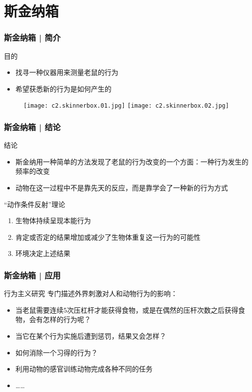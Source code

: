 \section{斯金纳箱}
\begin{frame}
  \frametitle{斯金纳箱 | 简介}
  \begin{block}{目的}
    \begin{itemize}
      \item 找寻一种仪器用来测量老鼠的行为
      \item 希望获悉新的行为是如何产生的
    \end{itemize}
  \end{block}
  \begin{figure}
    \centering
    \texttt{[image: c2.skinnerbox.01.jpg]}
    \texttt{[image: c2.skinnerbox.02.jpg]}
  \end{figure}
\end{frame}

\begin{frame}
  \frametitle{斯金纳箱 | 结论}
  \begin{block}{结论}
    \begin{itemize}
      \item 斯金纳用一种简单的方法发现了老鼠的行为改变的一个方面：一种行为发生的频率的改变
      \item 动物在这一过程中不是靠先天的反应，而是靠学会了一种新的行为方式
    \end{itemize}
  \end{block}
  \pause
  \begin{block}{“动作条件反射”理论}
    \begin{enumerate}
      \item 生物体持续呈现本能行为
      \item 肯定或否定的结果增加或减少了生物体重复这一行为的可能性
      \item 环境决定上述结果
    \end{enumerate}
  \end{block}
\end{frame}

\begin{frame}
  \frametitle{斯金纳箱 | 应用}
  \begin{block}{行为主义研究}
    专门描述外界刺激对人和动物行为的影响：
    \begin{itemize}
      \item 当老鼠需要连续5次压杠杆才能获得食物，或是在偶然的压杆次数之后获得食物，会有怎样的行为呢？
      \item 当它在某个行为实施后遭到惩罚，结果又会怎样？
      \item 如何消除一个习得的行为？
      \item 利用动物的感官训练动物完成各种不同的任务
      \item ……
    \end{itemize}
  \end{block}
\end{frame}

